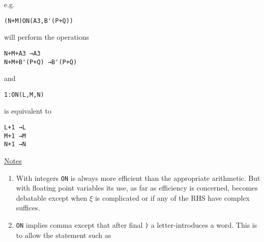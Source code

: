 \documentclass[10pt, a4paper, oneside]{article}
\newcommand{\myuline}[1]{\uline{#1}}
\newcommand{\mytt}[1]{\texttt{\scriptsize #1}}
\newcommand{\mytt}[1]{\texttt{\small #1}}
\begin{document}
\begin{multicols}{2}
\begin{flushleft}
e.g.
\end{flushleft}

\begin{addmargin}[1cm]{1em}%
\begin{lstlisting}
(N+M)ON(A3,B'(P+Q))
\end{lstlisting}
\end{addmargin}

\begin{flushleft}
will perform the operations
\end{flushleft}

\begin{addmargin}[1cm]{1em}%
\begin{lstlisting}
N+M+A3 →A3
N+M+B'(P+Q) →B'(P+Q)
\end{lstlisting}
\end{addmargin}

\begin{flushleft}
and
\end{flushleft}

\begin{addmargin}[1cm]{1em}%
\begin{lstlisting}
1:ON(L,M,N)
\end{lstlisting}
\end{addmargin}

\begin{flushleft}
is equivalent to
\end{flushleft}

\begin{addmargin}[1cm]{1em}%
\begin{lstlisting}
L+1 →L
M+1 →M
N+1 →N
\end{lstlisting}
\end{addmargin}


\begin{flushleft}
\myuline{Notes}
\end{flushleft}

\renewcommand{\labelenumi}{(\roman{enumi})}
\begin{enumerate}

\item With integers \mytt{ON} is always more efficient than the
appropriate arithmetic.  But with floating point
variables its use, as far as efficiency is concerned,
becomes debatable except when $\xi$ is complicated or if
any of the RHS have complex suffices.

\item \mytt{ON} implies comma except that after final \mytt{)} a
letter-introduces a word.  This is to allow the
statement such as


\end{enumerate}
\end{multicols}
\end{document}
